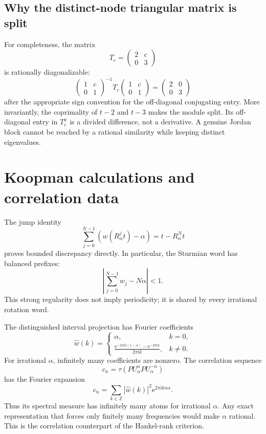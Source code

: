 \documentclass[11pt,oneside]{article}
\theoremstyle{definition}
\theoremstyle{remark}
\newcommand{\Z}{\mathbb Z}
\newcommand{\ee}{\mathrm e}
\newcommand{\ii}{\mathrm i}
\begin{document}
\subsection{Why the distinct-node triangular matrix is split}

For completeness, the matrix
\[
        T_c=\begin{pmatrix}2&c\\0&3\end{pmatrix}
\]
is rationally diagonalizable:
\[
 \begin{pmatrix}1&c\\0&1\end{pmatrix}^{-1}
 T_c
 \begin{pmatrix}1&c\\0&1\end{pmatrix}
 =
 \begin{pmatrix}2&0\\0&3\end{pmatrix}
\]
after the appropriate sign convention for the off-diagonal conjugating
entry.  More invariantly, the coprimality of \(t-2\) and \(t-3\) makes
the module split.  Its off-diagonal entry in \(T_c^x\) is a divided
difference, not a derivative.  A genuine Jordan block cannot be reached
by a rational similarity while keeping distinct eigenvalues.

\section{Koopman calculations and correlation data}

The jump identity
\[
        \sum_{j=0}^{N-1}(w(R_\alpha^jt)-\alpha)
        =t-R_\alpha^Nt
\]
proves bounded discrepancy directly.  In particular, the Sturmian word
has balanced prefixes:
\[
        \left|\sum_{j=0}^{N-1}w_j-N\alpha\right|<1.
\]
This strong regularity does not imply periodicity; it is shared by every
irrational rotation word.

The distinguished interval projection has Fourier coefficients
\[
 \widehat w(k)
 =
 \begin{cases}
 \alpha,&k=0,\\[0.6ex]
 \displaystyle
 \frac{\ee^{-2\pi\ii k(1-\alpha)}-\ee^{-2\pi\ii k}}{2\pi\ii k},
 &k\neq0.
 \end{cases}
\]
For irrational \(\alpha\), infinitely many coefficients are nonzero.
The correlation sequence
\[
 c_n=\tau(PU_\alpha^nPU_\alpha^{-n})
\]
has the Fourier expansion
\[
        c_n=\sum_{k\in\Z}|\widehat w(k)|^2
             \ee^{2\pi\ii kn\alpha}.
\]
Thus its spectral measure has infinitely many atoms for irrational
\(\alpha\).  Any exact representation that forces only finitely many
frequencies would make \(\alpha\) rational.  This is the correlation
counterpart of the Hankel-rank criterion.
\end{document}
